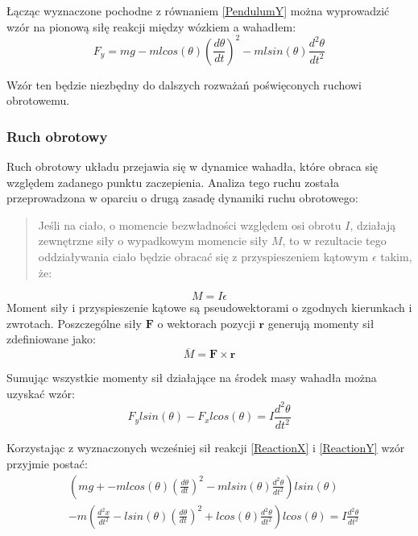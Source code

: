 \documentclass[12pt, twoside, openany]{report}
\theoremstyle{definition}
\begin{document}
\newpage
Łącząc wyznaczone pochodne z równaniem \ref{PendulumY} można wyprowadzić wzór na pionową siłę reakcji między wózkiem a wahadłem:
\begin{equation} \label{ReactionY}
F_y = mg - mlcos(\theta) (\frac{d\theta}{dt})^2 - mlsin(\theta) \frac{d^2\theta}{dt^2}
\end{equation}

Wzór ten będzie niezbędny do dalszych rozważań poświęconych ruchowi obrotowemu.

\subsubsection{Ruch obrotowy}
Ruch obrotowy układu przejawia się w dynamice wahadła, które obraca się względem zadanego punktu zaczepienia.
Analiza tego ruchu została przeprowadzona w oparciu o drugą zasadę dynamiki ruchu obrotowego:
\begin{quote}
Jeśli na ciało, o momencie bezwładności względem osi obrotu $I$, działają zewnętrzne siły o wypadkowym momencie siły $M$, to w rezultacie tego oddziaływania ciało będzie obracać się z przyspieszeniem kątowym $\epsilon$ takim, że:
\end{quote}
\begin{equation}
M = I \epsilon
\end{equation}
Moment siły i przyspieszenie kątowe są pseudowektorami o zgodnych kierunkach i zwrotach. Poszczególne siły $\mathbf{F}$ o wektorach pozycji $\mathbf{r}$ generują momenty sił  zdefiniowane jako:
\begin{equation}
\overline{M} = \mathbf{F} \times \mathbf{r}
\end{equation}

Sumując wszystkie momenty sił działające na środek masy wahadła można uzyskać wzór:
\begin{equation}
F_y l sin(\theta) - F_x lcos(\theta) = I\frac{d^2\theta}{dt^2}
\end{equation}

Korzystając z wyznaczonych wcześniej sił reakcji \ref{ReactionX} i \ref{ReactionY} wzór przyjmie postać:
\begin{equation}
\begin{aligned}
&(mg + -mlcos(\theta) (\frac{d\theta}{dt})^2 - mlsin(\theta) \frac{d^2\theta}{dt^2})lsin(\theta)\\
&-m (\frac{d^2x}{dt^2} - lsin(\theta)(\frac{d\theta}{dt})^2 + lcos(\theta) \frac{d^2\theta}{dt^2})lcos(\theta) = I\frac{d^2\theta}{dt^2}
\end{aligned}
\end{equation}
\end{document}
